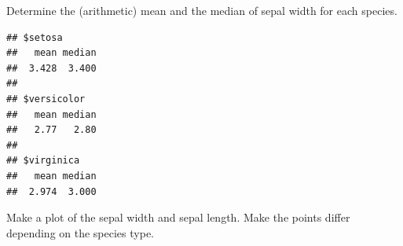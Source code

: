 \documentclass[
]{book}
\newenvironment{Shaded}{\begin{snugshade}}{\end{snugshade}}
\newcommand{\ControlFlowTok}[1]{\textcolor[rgb]{0.13,0.29,0.53}{\textbf{#1}}}
\newcommand{\KeywordTok}[1]{\textcolor[rgb]{0.13,0.29,0.53}{\textbf{#1}}}
\newcommand{\NormalTok}[1]{#1}
\newcommand{\OperatorTok}[1]{\textcolor[rgb]{0.81,0.36,0.00}{\textbf{#1}}}
\newcommand{\StringTok}[1]{\textcolor[rgb]{0.31,0.60,0.02}{#1}}
\begin{document}
Determine the (arithmetic) mean and the median of sepal width for each species.

\begin{Shaded}
\end{Shaded}

\begin{verbatim}
## $setosa
##   mean median 
##  3.428  3.400 
## 
## $versicolor
##   mean median 
##   2.77   2.80 
## 
## $virginica
##   mean median 
##  2.974  3.000
\end{verbatim}

Make a plot of the sepal width and sepal length. Make the points differ depending on the species type.
\end{document}
